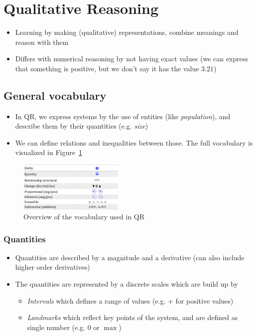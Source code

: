 \section{Qualitative Reasoning}
\begin{itemize}
	\item Learning by making (qualitative) representations, combine meanings and reason with them
	\item Differs with numerical reasoning by not having exact values (we can express that something is positive, but we don't say it has the value $3.21$) 
\end{itemize}
\subsection{General vocabulary}
\begin{itemize}
	\item In QR, we express systems by the use of entities (like \textit{population}), and describe them by their quantities (e.g. \textit{size})
	\item We can define relations and inequalities between those. The full vocabulary is visualized in Figure~\ref{fig:kr_qr_vocabulary}
\end{itemize}
\begin{figure}[ht!]
	\centering
	\includegraphics[width=0.45\textwidth]{figures/kr_qr_vocabulary.png}
	\caption{Overview of the vocabulary used in QR}
	\label{fig:kr_qr_vocabulary}
\end{figure}
\subsubsection{Quantities}
\begin{itemize}
	\item Quantities are described by a magnitude and a derivative (can also include higher order derivatives)
	\item The quantities are represented by a discrete scales which are build up by
	\begin{itemize}
		\item \textit{Intervals} which defines a range of values (e.g. $+$ for positive values)
		\item \textit{Landmarks} which reflect key points of the system, and are defined as single number (e.g. $0$ or $\max$)
	\end{itemize}
\end{itemize}

